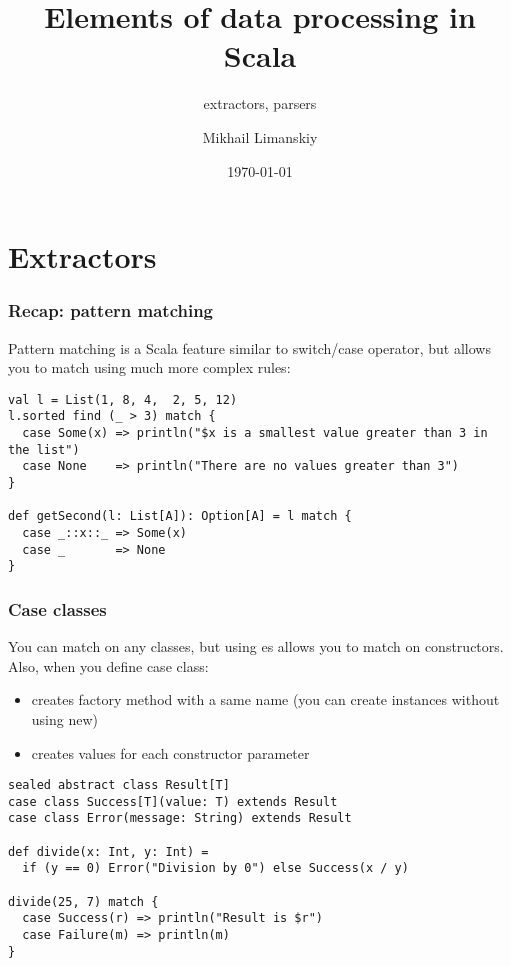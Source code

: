 \documentclass[t]{beamer}
\title{Elements of data processing in Scala}
\subtitle{extractors, parsers}
\author{Mikhail Limanskiy}
\institute{SymphonyTeleca}
\date{\today}
\begin{document}
\begin{frame}
    \titlepage
\end{frame}

\section{Extractors}

\begin{frame}[fragile]
\frametitle{Recap: pattern matching}
Pattern matching is a Scala feature similar to switch/case operator, but allows you to match
using much more complex rules:
\begin{example}
\begin{lstlisting}
val l = List(1, 8, 4,  2, 5, 12)
l.sorted find (_ > 3) match {
  case Some(x) => println("$x is a smallest value greater than 3 in the list")
  case None    => println("There are no values greater than 3")
}

def getSecond(l: List[A]): Option[A] = l match {
  case _::x::_ => Some(x)
  case _       => None
}
\end{lstlisting}
\end{example}
\end{frame}

\begin{frame}[fragile]
\frametitle{Case classes}
You can match on any classes, but using es allows you to match on constructors.
Also, when you define case class:
\begin{itemize}
\item creates factory method with a same name (you can create instances without using new)
\item creates values for each constructor parameter
\end{itemize}
\begin{example}
\begin{lstlisting}
sealed abstract class Result[T]
case class Success[T](value: T) extends Result
case class Error(message: String) extends Result

def divide(x: Int, y: Int) =
  if (y == 0) Error("Division by 0") else Success(x / y)

divide(25, 7) match {
  case Success(r) => println("Result is $r")
  case Failure(m) => println(m)
}
\end{lstlisting}
\end{example}
\end{frame}
\end{document}
